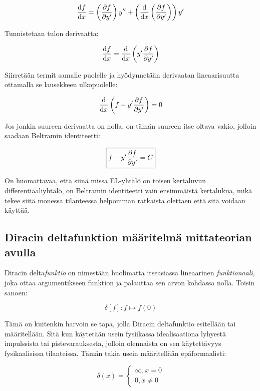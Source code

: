 \documentclass[../johdoksia.tex]{subfiles}
\begin{document}
	\begin{equation*}
		\odv{f}{x} = \left(\pdv{f}{y'}\right)y'' + \left(\odv{}{x}\left(\pdv{f}{y'}\right)\right)y'
	\end{equation*}

	Tunnistetaan tulon derivaatta:
	
	\begin{equation*}
		\odv{f}{x} = \odv{}{x}\left(y'\pdv{f}{y'}\right)
	\end{equation*}

	Siirretään termit samalle puolelle ja hyödynnetään derivaatan lineaarisuutta ottamalla se lausekkeen ulkopuolelle:
	
	\begin{equation*}
		\odv{}{x}\left(f - y'\pdv{f}{y'}\right) = 0
	\end{equation*}

	Jos jonkin suureen derivaatta on nolla, on tämän suureen itse oltava vakio, jolloin saadaan Beltramin identiteetti:
	
	\begin{equation}
		\boxed{f - y'\pdv{f}{y'} = C}
	\end{equation}

	On huomattavaa, että siinä missa EL-yhtälö on toisen kertaluvun differentiaaliyhtälö, on Beltramin identiteetti vain ensimmäistä kertalukua, mikä tekee siitä monessa tilanteessa helpomman ratkaista olettaen että sitä voidaan käyttää.
	
	\subsection{Diracin deltafunktion määritelmä mittateorian avulla}
	
	Diracin delta\emph{funktio} on nimestään huolimatta itseasiassa lineaarinen \emph{funktionaali}, joka ottaa argumentikseen funktion ja palauttaa sen arvon kohdassa nolla. Toisin sanoen:
	
	\begin{equation*}
		\delta[f]: f \mapsto f(0)
	\end{equation*}

	Tämä on kuitenkin harvoin se tapa, jolla Diracin deltafunktio esitellään tai määritellään. Sitä kun käytetään usein fysiikassa idealisaationa lyhyestä impulssista tai pistevarauksesta, jolloin olennaista on sen käytettävyys fysikaalisissa tilanteissa. Tämän takia usein määritellään epäformaalisti:
	
	\begin{equation*}
		\delta(x) = \begin{cases}
			\infty, x = 0 \\
			0, x \neq 0
		\end{cases}
	\end{equation*}
\end{document}

